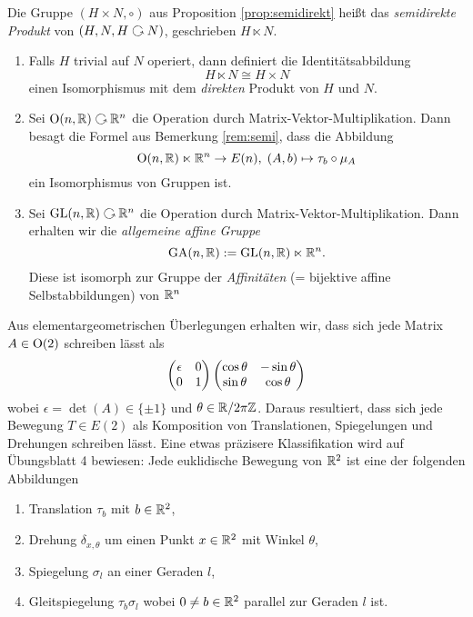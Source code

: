\documentclass{book}
\begin{document}
\begin{defi}
    \label{defi:semidirekt}
    Die Gruppe $(H \times N, \circ)$ aus Proposition \ref{prop:semidirekt}
    heißt das \emph{semidirekte Produkt} von $(H,N, H \actson N)$, geschrieben
    $H \ltimes N$. 
\end{defi}

\begin{exas}
    \label{exas:semidirekt}
    \begin{enumerate}
        \item Falls $H$ trivial auf $N$ operiert, dann definiert die Identitätsabbildung
            \[
                H \ltimes N \cong H \times N
            \]
            einen Isomorphismus mit dem \emph{direkten} Produkt von $H$ und $N$.
        \item Sei $\O(n,\RR) \actson \RR^n$ die Operation durch
            Matrix-Vektor-Multiplikation. Dann besagt die Formel aus Bemerkung
            \ref{rem:semi}, dass die Abbildung
            \[
                \operatorname{O}(n,\mathbb{R}) \ltimes \mathbb{R}^n \to E(n),\; (A,b) \mapsto \tau_{b} \circ \mu_A
            \]
            ein Isomorphismus von Gruppen ist.
        \item Sei $\GL(n,\RR) \actson \RR^n$ die Operation durch
            Matrix-Vektor-Multiplikation. Dann erhalten wir die {\em allgemeine affine Gruppe}
            \[
                \operatorname{GA}(n,\mathbb{R}) := \operatorname{GL}(n,\mathbb{R}) \ltimes \mathbb{R}^n. 
            \]
            Diese ist isomorph zur Gruppe der {\em Affinitäten} (= bijektive
            affine Selbstabbildungen) von $\mathbb{R}^n$
    \end{enumerate}
\end{exas}

\begin{exa}
    \label{exa:e2}
    Aus elementargeometrischen Überlegungen erhalten wir, dass sich jede Matrix $A \in \operatorname{O}(2)$ schreiben lässt als
    \[
        \begin{pmatrix}  \epsilon & 0 \\ 0 & 1 \end{pmatrix} \begin{pmatrix}  \cos \theta & - \sin \theta\\ \sin \theta & \cos \theta  \end{pmatrix}
    \]
    wobei $\epsilon = \det(A) \in \{\pm 1\}$ und $\theta \in \mathbb{R}/2\pi \mathbb{Z}$.
    Daraus resultiert, dass sich jede Bewegung $T \in E(2)$ als Komposition von
    Translationen, Spiegelungen und Drehungen schreiben lässt. Eine etwas
    präzisere Klassifikation wird auf Übungsblatt 4 bewiesen: Jede euklidische
    Bewegung von $\mathbb{R}^2$ ist eine der folgenden Abbildungen
	\begin{enumerate}
		\item Translation $\tau_b$ mit $b \in \mathbb{R}^2$, 
		\item Drehung $\delta_{x,\theta}$ um einen Punkt $x \in \mathbb{R}^2$ mit Winkel
			$\theta$,
		\item Spiegelung $\sigma_l$ an einer Geraden $l$,
		\item Gleitspiegelung $\tau_b\sigma_l$ wobei $0 \ne b \in \mathbb{R}^2$ parallel zur Geraden $l$
			ist.
	\end{enumerate}
\end{exa}
\end{document}
